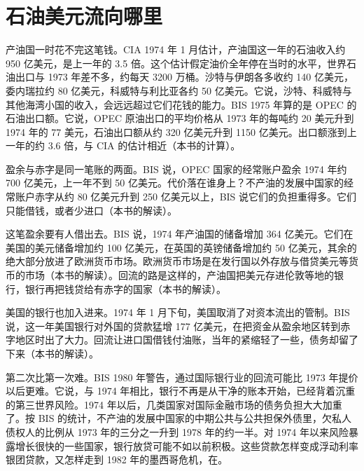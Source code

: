 \section{石油美元流向哪里}\label{sec:oil-recycling}

产油国一时花不完这笔钱。CIA 1974 年 1 月估计，产油国这一年的石油收入约 950 亿美元，是上一年的 3.5 倍\cite{frus47}。这个估计假定油价全年停在当时的水平，世界石油出口与 1973 年差不多，约每天 3200 万桶\cite{frus47}。沙特与伊朗各多收约 140 亿美元，委内瑞拉约 80 亿美元，科威特与利比亚各约 50 亿美元\cite{frus47}。它说，沙特、科威特与其他海湾小国的收入，会远远超过它们花钱的能力\cite{frus47}。BIS 1975 年算的是 OPEC 的石油出口额。它说，OPEC 原油出口的平均价格从 1973 年的每吨约 20 美元升到 1974 年的 77 美元，石油出口额从约 320 亿美元升到 1150 亿美元\cite{bis1975}。出口额涨到上一年的约 3.6 倍，与 CIA 的估计相近（本书的计算）。

盈余与赤字是同一笔账的两面。BIS 说，OPEC 国家的经常账户盈余 1974 年约 700 亿美元，上一年不到 50 亿美元\cite{bis1975}。代价落在谁身上？不产油的发展中国家的经常账户赤字从约 80 亿美元升到 250 亿美元以上，BIS 说它们的负担重得多\cite{bis1975}。它们只能借钱，或者少进口（本书的解读）。

这笔盈余要有人借出去。BIS 说，1974 年产油国的储备增加 364 亿美元\cite{bis1975}。它们在美国的美元储备增加约 100 亿美元，在英国的英镑储备增加约 50 亿美元，其余的绝大部分放进了欧洲货币市场\cite{bis1975}。欧洲货币市场是在发行国以外存放与借贷美元等货币的市场（本书的解读）。回流的路是这样的，产油国把美元存进伦敦等地的银行，银行再把钱贷给有赤字的国家（本书的解读）。

美国的银行也加入进来。1974 年 1 月下旬，美国取消了对资本流出的管制\cite{bis1975}。BIS 说，这一年美国银行对外国的贷款猛增 177 亿美元，在把资金从盈余地区转到赤字地区时出了大力\cite{bis1975}。回流让进口国借钱付油账，当年的紧缩轻了一些，债务却留了下来（本书的解读）。

第二次比第一次难。BIS 1980 年警告，通过国际银行业的回流可能比 1973 年提价以后更难\cite{bis1980}。它说，与 1974 年相比，银行不再是从干净的账本开始，已经背着沉重的第三世界风险\cite{bis1980}。1974 年以后，几类国家对国际金融市场的债务负担大大加重了\cite{bis1980}。按 BIS 的统计，不产油的发展中国家的中期公共与公共担保外债里，欠私人债权人的比例从 1973 年的三分之一升到 1978 年的约一半\cite{bis1980}。对 1974 年以来风险暴露增长很快的一些国家，银行放贷可能不如以前积极\cite{bis1980}。这些贷款怎样变成浮动利率银团贷款，又怎样走到 1982 年的墨西哥危机，在。

